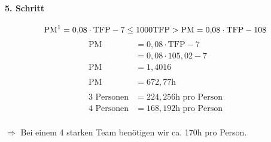 \paragraph{5. Schritt}
\[\text{PM\footnotemark} = 0{,}08 \cdot \text{TFP}-7 \leq 1000\text{TFP} > \text{PM} = 0{,}08 \cdot \text{TFP}-108\]
\begin{align*}
	\text{PM} &= 0{,}08 \cdot \text{TFP} - 7 \\
			  &= 0{,}08 \cdot 105{,}02 -7\\
	\text{PM} &= 1{,}4016\\
	\\
	\text{PM} &= 672{,}77 \text{h}\\
	\\
	\text{3 Personen} &= 224{,}256\text{h pro Person}\\
	\text{4 Personen} &= 168{,}192\text{h pro Person}\\
\end{align*}

$\Rightarrow$ Bei einem 4 starken Team benötigen wir ca. 170h pro Person.
